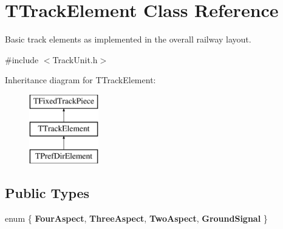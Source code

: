 \hypertarget{class_t_track_element}{}\section{T\+Track\+Element Class Reference}
\label{class_t_track_element}


Basic track elements as implemented in the overall railway layout.  




{\ttfamily \#include $<$Track\+Unit.\+h$>$}

Inheritance diagram for T\+Track\+Element\+:\begin{figure}[H]
\begin{center}
\leavevmode
\includegraphics[height=3.000000cm]{class_t_track_element}
\end{center}
\end{figure}
\subsection*{Public Types}
\begin{DoxyCompactItemize}
\item 
\mbox{\label{class_t_track_element_abbbcaeb3e062e962d53337965d4fcaad}} 
enum \{ {\bfseries Four\+Aspect}, 
{\bfseries Three\+Aspect}, 
{\bfseries Two\+Aspect}, 
{\bfseries Ground\+Signal}
 \}
\end{DoxyCompactItemize}
